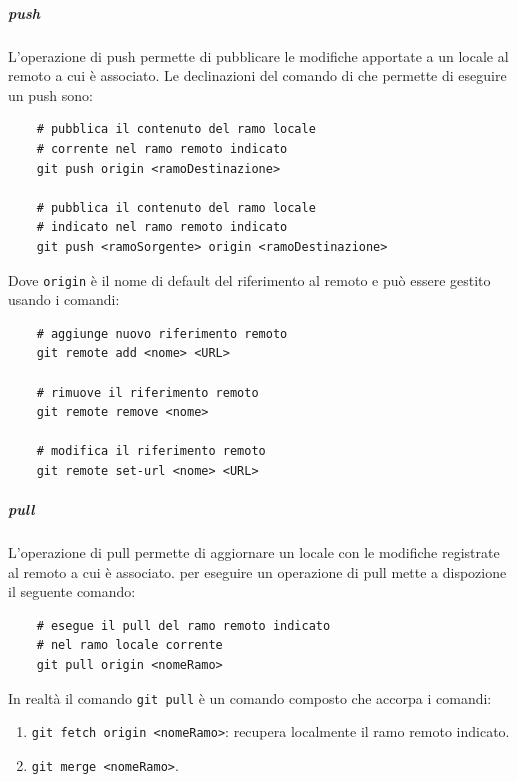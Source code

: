 \subparagraph{push}
\label{subpar:push}
L'operazione di push permette di pubblicare le modifiche apportate a un  locale al  remoto a cui è associato.
Le declinazioni del comando di  che permette di eseguire un push sono:
\begin{lstlisting}
    # pubblica il contenuto del ramo locale 
    # corrente nel ramo remoto indicato
    git push origin <ramoDestinazione> 

    # pubblica il contenuto del ramo locale
    # indicato nel ramo remoto indicato
    git push <ramoSorgente> origin <ramoDestinazione>
\end{lstlisting}   
Dove \texttt{origin} è il nome di default del riferimento al  remoto e può essere gestito usando i comandi:
\begin{lstlisting}
    # aggiunge nuovo riferimento remoto
    git remote add <nome> <URL>

    # rimuove il riferimento remoto
    git remote remove <nome>

    # modifica il riferimento remoto
    git remote set-url <nome> <URL>
\end{lstlisting}

\subparagraph{pull}
\label{subpar:pull}
L'operazione di pull permette di aggiornare un  locale con le modifiche registrate al  remoto a cui è associato.
 per eseguire un operazione di pull mette a dispozione il seguente comando:
\begin{lstlisting}
    # esegue il pull del ramo remoto indicato
    # nel ramo locale corrente
    git pull origin <nomeRamo>
\end{lstlisting}
In realtà il comando \lstinline|git pull| è un comando composto che accorpa i comandi:
\begin{enumerate}
    \item \lstinline|git fetch origin <nomeRamo>|: recupera localmente il ramo remoto indicato.
    \item \lstinline|git merge <nomeRamo>|.
\end{enumerate}

